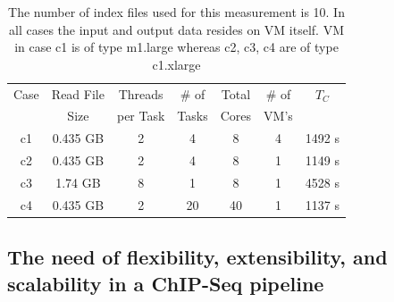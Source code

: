 \documentclass{cpeauth}
\begin{document}


 \begin{table}
 \small
 \begin{tabular}{|c|c|c|c|c|c|c|} 
 \hline 
 Case&Read File&Threads  & \# of & Total & \# of  &  $T_C$  \\ 
     & Size  & per Task & Tasks & Cores &  VM's & \\ 
\hline

c1& 0.435 GB&2 &  4 & 8 & 4 & 1492 s\\
c2 &0.435 GB & 2 & 4  & 8  & 1 &1149 s\\ 
c3 & 1.74 GB &8 & 1 &  8 & 1 &4528 s \\\hline
\hline
c4 & 0.435 GB&2 & 20 & 40 & 1 &1137 s \\
\hline

 \end{tabular}

 \caption{ The number of index files used for this measurement is 10.
   In all cases the input and output data resides on VM itself.  VM in
   case c1 is of type m1.large whereas c2, c3, c4 are of type
   c1.xlarge }
  \label{table:cloud-VM} 
\end{table}


\subsection{The need of flexibility, extensibility, and scalability in a ChIP-Seq pipeline}
\end{document}
